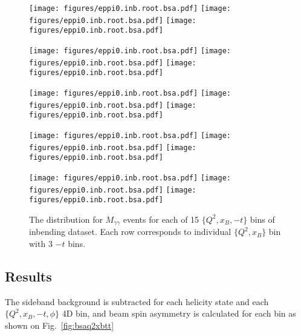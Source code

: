\begin{figure}[hbt]
	\centering
	\texttt{[image: figures/eppi0.inb.root.bsa.pdf]}
	\texttt{[image: figures/eppi0.inb.root.bsa.pdf]}
	\texttt{[image: figures/eppi0.inb.root.bsa.pdf]}
	
	\texttt{[image: figures/eppi0.inb.root.bsa.pdf]}
	\texttt{[image: figures/eppi0.inb.root.bsa.pdf]}
	\texttt{[image: figures/eppi0.inb.root.bsa.pdf]}

	\texttt{[image: figures/eppi0.inb.root.bsa.pdf]}
	\texttt{[image: figures/eppi0.inb.root.bsa.pdf]}
	\texttt{[image: figures/eppi0.inb.root.bsa.pdf]}

	\texttt{[image: figures/eppi0.inb.root.bsa.pdf]}
	\texttt{[image: figures/eppi0.inb.root.bsa.pdf]}
	\texttt{[image: figures/eppi0.inb.root.bsa.pdf]}

	\texttt{[image: figures/eppi0.inb.root.bsa.pdf]}
	\texttt{[image: figures/eppi0.inb.root.bsa.pdf]}
	\texttt{[image: figures/eppi0.inb.root.bsa.pdf]}

	
	\caption{The distribution for $M_{\gamma\gamma}$ events for each of 15 $\{Q^2,x_B,-t\}$ bins of inbending dataset. Each row corresponds to individual $\{Q^2,x_B\}$ bin with 3 $-t$ bins.}
	\label{fig:mgginq2xbtt}
\end{figure}


\subsection{Results}
The sideband background is subtracted for each helicity state and each $\{Q^2,x_B,-t,\phi\}$ 4D bin, and beam spin asymmetry is calculated for each bin as shown on Fig.~\ref{fig:bsaq2xbtt}

